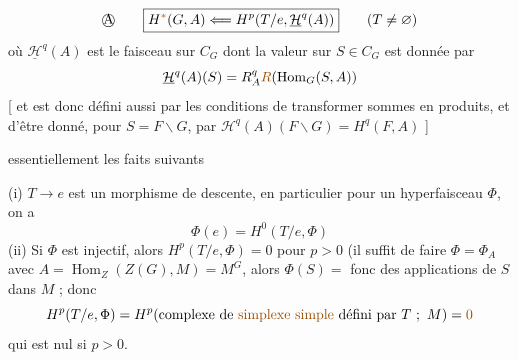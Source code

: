 \[\text{\textcircled{A}}\qquad\boxed{H^{\unsure{*}}(G,A)\Longleftarrow H^p(T/e,\underline{\mathcal H}^{q}(A))}\qquad(T\ne\varnothing)\]
où $\underline{\mathcal H}^{q}(A)$ est le faisceau sur $C_G$  dont la valeur sur $S\in C_G$ est donnée par
\[
\underline{\mathcal H}^{q}(A)(S)=R_A^q\deleted{\unsure{R}}(\operatorname{Hom}_{G}(S,A))
\]
[ et est donc défini aussi par les conditions de  transformer sommes  en produits, et d'être donné, pour $S=F\backslash G$, par $\mathcal H^q(A)(F\backslash G)=H^q(F,A)$ ]

  essentiellement les faits suivants

(i) $T\longrightarrow e$ est un morphisme de descente, en particulier  pour un hyperfaisceau $\Phi$, on a
\[
\Phi(e)=H^0(T/e,\Phi)
\]
(ii) Si $\Phi$ est  injectif, alors $H^p(T/e,\Phi)=0$ pour $p>0$ (il suffit de faire $\Phi=\Phi_A$ avec $A=\operatorname{Hom}_{Z}(Z(G),M)=M^G$, alors $\Phi(S)=$ fonc des applications de $S$ dans $M$ ; donc
\[
H^p(T/e,\Phi)=H^p(\text{complexe de \unsure{simplexe} \unsure{simple} défini par }T\ ;\ M)=\unsure{0}
\]
qui est nul si $p>0$.
